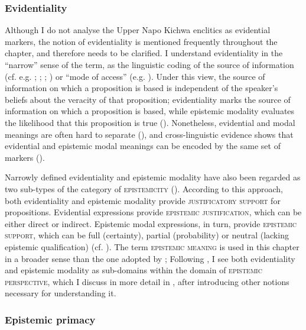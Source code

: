 \documentclass[output=paper]{langscibook}
\begin{document}
\subsubsection{Evidentiality}\label{s:kg1-3-1}

Although I do not analyse the Upper Napo Kichwa enclitics as evidential markers, the notion of evidentiality is mentioned frequently throughout the chapter, and therefore needs to be clarified. I understand evidentiality in the “narrow” sense of the term, as the linguistic coding of the source of information (cf. e.g. \citealt[54]{Willett1988}; \citealt{Nikolaeva2000}; \citealt[342--343]{Dendale2001}; \citealt{Aikhenvald2004}) or “mode of access” (e.g. \citealt{GonzalezRuiz2016}). Under this view, the source of information on which a proposition is based is independent of the speaker’s beliefs about the veracity of that proposition; evidentiality marks the source of information on which a proposition is based, while epistemic modality evaluates the likelihood that this proposition is true (\citealt{Cornille2009}). Nonetheless, evidential and modal meanings are often hard to separate (\citealt{Palmer2001}), and cross-linguistic evidence shows that evidential and epistemic modal meanings can be encoded by the same set of markers (\citealt[55]{Willett1988}).

Narrowly defined evidentiality and epistemic modality have also been regarded as two sub-types of the category of \textsc{epistemicity} (\citealt{Boye2012}). According to this approach, both evidentiality and epistemic modality provide \textsc{justificatory support} for propositions. Evidential expressions provide \textsc{epistemic justification}, which can be either direct or indirect. Epistemic modal expressions, in turn, provide \textsc{epistemic support}, which can be full (certainty), partial (probability) or neutral (lacking epistemic qualification) (cf. \citealt[36]{Boye2012}). The term \textsc{epistemic meaning} is used in this chapter in a broader sense than the one adopted by \cite[sec. 1.5]{Boye2012}; Following \citet{Bergqvist2017}, I see both evidentiality and epistemic modality as sub-domains within the domain of \textsc{epistemic perspective}, which I discuss in more detail in , after introducing other notions necessary for understanding it.

\subsubsection{Epistemic primacy}\label{s:kg1-3-2}
\end{document}
